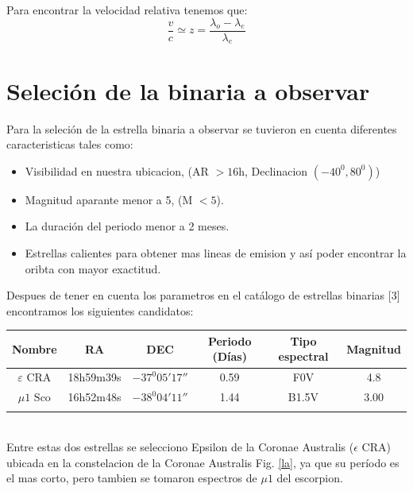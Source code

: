\documentclass[Proceedings]{ascelike}
\begin{document}
Para encontrar la velocidad relativa tenemos que:
\begin{equation}
\dfrac{v}{c} \simeq z = \dfrac{\lambda_{o} - \lambda_{e}}{ \lambda_{e}}
\label{v}
\end{equation} 

\section{Seleci\'on de la binaria a observar}

Para la seleci\'on de la estrella binaria a observar se tuvieron en cuenta 
diferentes caracteristicas tales como:

\begin{itemize}
\item Visibilidad en nuestra ubicacion, (AR $> 16$h, Declinacion $(-40^{0}, 80^{0})$)
\item Magnitud aparante menor a 5, (M $<5$).
\item La duraci\'on del periodo menor a 2 meses.
\item Estrellas calientes para obtener mas lineas de emision y as\'i poder
encontrar la oribta con mayor exactitud.
\end{itemize}

Despues de tener en cuenta los parametros en el cat\'alogo de estrellas binarias [3] encontramos los siguientes candidatos:\\

\begin{tabular}{c c c c c c}
\hline
Nombre & RA & DEC & Periodo (D\'ias) & Tipo espectral & Magnitud\\
\hline
$\varepsilon$ $\mathrm{CRA}$ & 18h59m39s & $-37^{0}05' 17''$ & 0.59 & F0V & 4.8\\
\hline
$\mu 1$ $\mathrm{Sco}$ & 16h52m48s & $-38^{0}04'11''$& 1.44 & B1.5V& 3.00\\
\hline
\\
\end{tabular}
\\
Entre estas dos estrellas se selecciono Epsilon de la Coronae Australis (${\epsilon}$ CRA) ubicada en la 
constelacion de la Coronae Australis Fig. \ref{la}, ya que su per\'iodo es el mas corto, pero tambien se tomaron 
espectros de $\mu 1$ del escorpion. 
\end{document}
